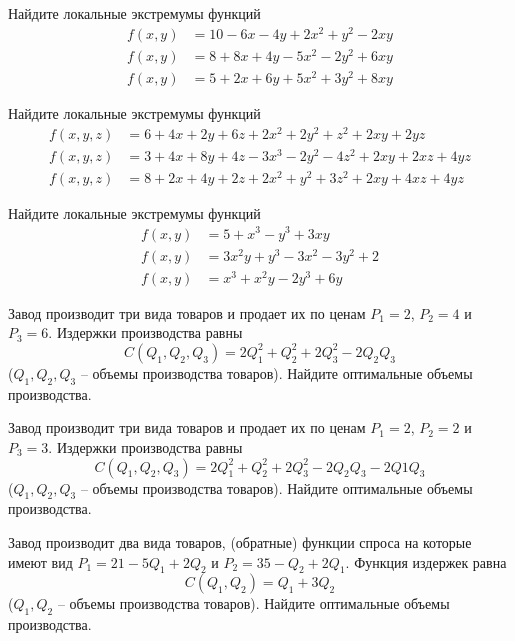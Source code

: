 
\begin{exercise}
Найдите локальные экстремумы функций
\begin{align*}
	f(x,y) &= 10-6x-4y+2x^2+y^2-2xy \\
	f(x,y) &= 8+8x+4y-5x^2-2y^2+6xy \\
	f(x,y) &= 5+2x+6y+5x^2+3y^2+8xy
\end{align*}
\end{exercise}

\begin{exercise}
Найдите локальные экстремумы функций
\begin{align*}
	f(x,y,z) &= 6+4x+2y+6z+2x^2+2y^2+z^2+2xy+2yz \\
	f(x,y,z) &= 3+4x+8y+4z-3x^3-2y^2-4z^2+2xy+2xz+4yz\\
	f(x,y,z) &= 8+2x+4y+2z+2x^2+y^2+3z^2+2xy+4xz+4yz
\end{align*}
\end{exercise}

\begin{exercise}
Найдите локальные экстремумы функций
\begin{align*}
	f(x,y) &= 5+x^3-y^3+3xy \\
	f(x,y) &= 3x^2y+y^3-3x^2-3y^2+2 \\
	f(x,y) &= x^3+x^2y-2y^3+6y
\end{align*}
\end{exercise}

\begin{exercise}
Завод производит три вида товаров и продает их по ценам $P_1=2$, $P_2=4$ и $P_3=6$.
Издержки производства равны
\[
	C(Q_1,Q_2,Q_3)=2Q_1^2+Q_2^2+2Q_3^2-2Q_2Q_3
\]
($Q_1, Q_2, Q_3$ -- объемы производства товаров). Найдите оптимальные объемы производства. 
\end{exercise}

\begin{exercise}
Завод производит три вида товаров и продает их по ценам $P_1=2$, $P_2=2$ и $P_3=3$.
Издержки производства равны 
\[
	C(Q_1,Q_2,Q_3)=2Q_1^2+Q_2^2+2Q_3^2-2Q_2Q_3-2Q1Q_3
\]
($Q_1, Q_2, Q_3$ -- объемы производства товаров).
Найдите оптимальные объемы производства.
\end{exercise}

\begin{exercise}
Завод производит два вида товаров, (обратные) функции спроса на которые
имеют вид $P_1=21-5Q_1+2Q_2$ и $P_2=35-Q_2+2Q_1$. Функция
издержек равна
\[
	C(Q_1,Q_2)=Q_1+3Q_2
\]
($Q_1, Q_2$ -- объемы производства товаров). Найдите оптимальные объемы производства. 
\end{exercise}

